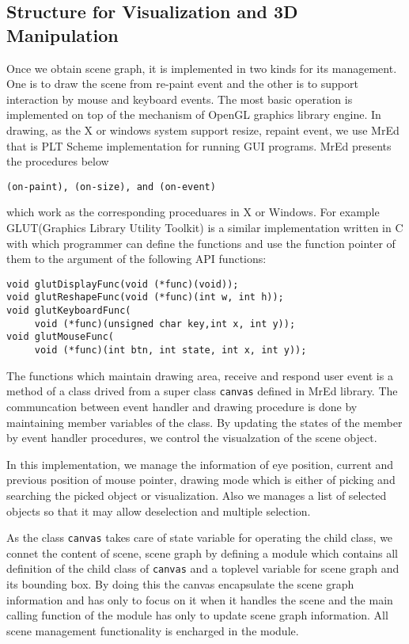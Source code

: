 \documentclass[preprint,nocopyrightspace]{sigplanconf}
\begin{document}
\subsection{Structure for Visualization and 3D Manipulation}
\label{STR_VIZ}

Once we obtain scene graph, it is implemented in two kinds for its management. One is to draw the scene from re-paint event and the other is to support interaction by mouse and keyboard events.
 The most basic operation is implemented on top of the mechanism of OpenGL graphics library engine.
 In drawing, as the X or windows system support resize, repaint event, we use MrEd\cite{MrEd} that is PLT Scheme implementation for running GUI programs. MrEd presents the procedures below
\begin{verbatim}
(on-paint), (on-size), and (on-event)
\end{verbatim}
which work as the corresponding proceduares in X or Windows. For example GLUT(Graphics Library Utility Toolkit)\cite{GLUT} is a similar implementation written in C with which programmer can define the functions and use the function pointer of them to the argument of the following API functions:
\begin{verbatim}
void glutDisplayFunc(void (*func)(void));
void glutReshapeFunc(void (*func)(int w, int h));
void glutKeyboardFunc(
     void (*func)(unsigned char key,int x, int y));
void glutMouseFunc(
     void (*func)(int btn, int state, int x, int y));
\end{verbatim}

The functions which maintain drawing area, receive and respond user event is a method of a class drived from a super class {\tt canvas} defined in MrEd library. 
The communcation between event handler and drawing procedure is done by maintaining member variables of the class. 
By updating the states of the member by event handler procedures, we control the visualzation of the scene object. 

In this implementation, we manage the information of eye position, current and previous position of mouse pointer, drawing mode which is either of picking and searching the picked object or visualization. Also we manages a list of selected objects so that it may allow deselection and multiple selection. 

As the class {\tt canvas} takes care of state variable for operating the child class, we connet the content of scene, scene graph by defining a module which contains all definition of the child class of {\tt canvas} and a toplevel variable for scene graph and its bounding box. 
By doing this the canvas encapsulate the scene graph information and has only to focus on it when it handles the scene and the main calling function of the module has only to update scene graph information. All scene management functionality is encharged in the module.
\end{document}
